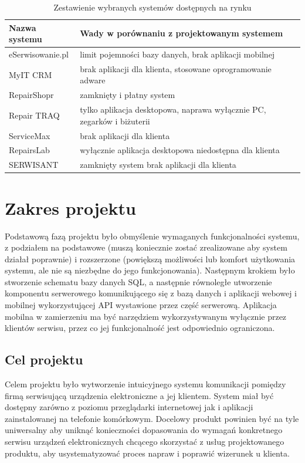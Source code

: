 \documentclass[a4paper,11pt]{article}
\begin{document}
\begin{table}[H]
	\centering
	\caption{Zestawienie wybranych systemów dostępnych na rynku}
	\bgroup
	\begin{tabular}{l|l|}
		\hline
		\multicolumn{1}{|l||}{\textbf{Nazwa systemu}} & \textbf{Wady w porównaniu z projektowanym systemem}\\ \hline \hline
		\multicolumn{1}{|l||}{eSerwisowanie.pl} & limit pojemności bazy danych, brak aplikacji mobilnej \\ \hline
		\multicolumn{1}{|l||}{MyIT CRM} & brak aplikacji dla klienta, stosowane oprogramowanie adware \\ \hline
		\multicolumn{1}{|l||}{RepairShopr} & zamknięty i płatny system \\ \hline
		\multicolumn{1}{|l||}{Repair TRAQ} & tylko aplikacja desktopowa, naprawa wyłącznie PC, zegarków i biżuterii \\ \hline
		\multicolumn{1}{|l||}{ServiceMax} & brak aplikacji dla klienta \\ \hline
		\multicolumn{1}{|l||}{RepairsLab} & wyłącznie aplikacja desktopowa niedostępna dla klienta \\ \hline
		\multicolumn{1}{|l||}{SERWISANT} & zamknięty system brak aplikacji dla klienta \\ \hline
		
		
	\end{tabular}
	\egroup
\end{table}
\section{Zakres projektu}
Podstawową fazą projektu było obmyślenie wymaganych funkcjonalności systemu, z podziałem na podstawowe (muszą koniecznie zostać zrealizowane aby system działał poprawnie) i rozszerzone (powiększą możliwości lub komfort użytkowania systemu, ale nie są niezbędne do jego funkcjonowania). Następnym krokiem było stworzenie schematu bazy danych SQL, a następnie równoległe utworzenie komponentu serwerowego komunikującego się z bazą danych i aplikacji webowej i mobilnej wykorzystującej API wystawione przez część serwerową. Aplikacja mobilna w zamierzeniu ma być narzędziem wykorzystywanym wyłącznie przez klientów serwisu, przez co jej funkcjonalność jest odpowiednio ograniczona.
\subsection{Cel projektu}
Celem projektu było wytworzenie intuicyjnego systemu komunikacji pomiędzy firmą serwisującą urządzenia elektroniczne a jej klientem. System miał być dostępny zarówno z poziomu przeglądarki internetowej jak i aplikacji zainstalowanej na telefonie komórkowym. Docelowy produkt powinien być na tyle uniwersalny aby uniknąć konieczności dopasowania do wymagań konkretnego serwisu urządzeń elektronicznych chcącego skorzystać z usług projektowanego produktu, aby usystematyzować proces napraw i poprawić wizerunek u klienta.
\end{document}
